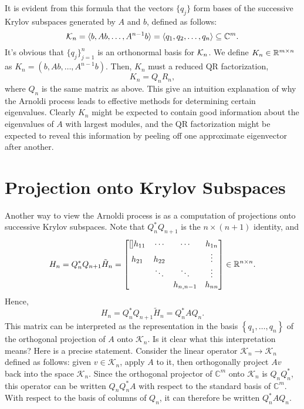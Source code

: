  It is evident from this formula that the vectors $\{q_j\}  $ form bases of the successive Krylov subspaces generated by $ A $ and $ b $, defined as follows: 
\[
    \mathcal{K}_n = \langle b, Ab, \ldots ,A^{n-1}b \rangle  = \langle q_1,q_2,\ldots ,q_n \rangle \subseteq \mathbb{C}^{m}. 
\]
It's obvious that $\{q_j\} _{j=1}^n$ is an orthonormal basis for $ \mathcal{K}_n $.  We define $ K_n \in \mathbb{R}^{m \times n} $ as $ K_n = (b, Ab, \ldots ,A^{n-1}b) $. Then, $ K_n $ must a reduced QR factorization, 
\begin{equation}
\label{eq: QR of K_n}
    K_n = Q_n R_n,
\end{equation}
where $ Q_n $ is the same matrix as above.  This give an intuition explanation of why the Arnoldi process leads to effective methods for determining certain eigenvalues. Clearly $K_n$ might be expected to contain good information about the eigenvalues of $ A $ with largest modules, and the QR factorization might be expected to reveal this information by peeling off one approximate eigenvector after another.  

\section{Projection onto Krylov Subspaces}

 Another way to view the Arnoldi process is as a computation of projections onto successive Krylov subspaces. Note that $ Q_n^*Q_{n+1} $ is the $ n\times (n+1)$ identity, and 
 \[
    H_n = Q_n^* Q_{n+1}\tilde H_n = \begin{bmatrix}[] 
        h_{11} & \cdots & \cdots &  h_{1n} \\
        h_{21} & h_{22}  &  &\vdots   \\
         &\ddots  &\ddots  &\vdots   \\
         &  & h_{n,n-1}  & h_{nn}  \\
    \end{bmatrix} \in \mathbb{R}^{n\times n}.
 \]
 Hence, 
 \[
    H_n = Q_n^* Q_{n+1}\tilde H_n = Q_n^* A Q_n. 
 \]
 This matrix can be interpreted as the representation in the basis $\left\{q_1, \ldots, q_n\right\}$ of the orthogonal projection of $A$ onto $\mathcal{K}_n$. Is it clear what this interpretation means? Here is a precise statement. Consider the linear operator $\mathcal{K}_n \rightarrow \mathcal{K}_n$ defined as follows: given $v \in \mathcal{K}_n$, apply $A$ to it, then orthogonally project $A v$ back into the space $\mathcal{K}_n$. Since the orthogonal projector of $\mathbb{C}^m$ onto $\mathcal{K}_n$ is $Q_n Q_n^*$, this operator can be written $Q_n Q_n^* A$ with respect to the standard basis of $\mathbb{C}^m$. With respect to the basis of columns of $Q_n$, it can therefore be written $Q_n^* A Q_n$.

